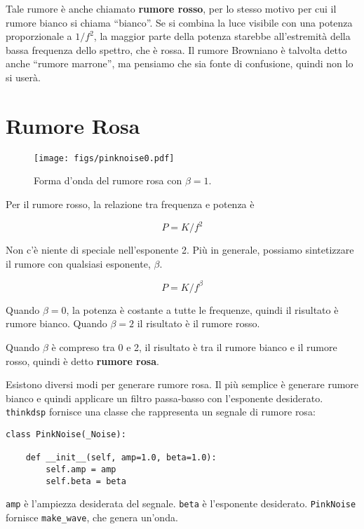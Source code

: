 \documentclass[12pt,a4paper]{book}
\begin{document}
Tale rumore è anche chiamato {\bf rumore rosso}, per lo stesso motivo per cui il rumore bianco si chiama ``bianco''. Se si combina la luce visibile con una potenza proporzionale a $1/f^2$, la maggior parte della potenza starebbe all'estremità della bassa frequenza dello spettro, che è rossa. Il rumore Browniano è talvolta detto anche ``rumore marrone'', ma pensiamo che sia fonte di confusione, quindi non lo si userà.

\section{Rumore Rosa} \label{pink} 

\begin{figure} 

\centerline{\texttt{[image: figs/pinknoise0.pdf]}} \caption{Forma d'onda del rumore rosa con $\beta=1$.} \label{fig.pinknoise0} \end{figure} 

Per il rumore rosso, la relazione tra frequenza e potenza è

%
\[ P = K / f^{2} \] 

%
Non c'è niente di speciale nell'esponente 2. Più in generale, possiamo sintetizzare il rumore con qualsiasi esponente, $\beta$.

%
\[ P = K / f^{\beta} \] 

%
Quando $\beta = 0$, la potenza è costante a tutte le frequenze, quindi il risultato è rumore bianco. Quando $\beta=2$ il risultato è il rumore rosso.

Quando $\beta$ è compreso tra 0 e 2, il risultato è tra il rumore bianco e il rumore rosso, quindi è detto {\bf rumore rosa}.

Esistono diversi modi per generare rumore rosa. Il più semplice è generare rumore bianco e quindi applicare un filtro passa-basso con l'esponente desiderato. {\tt thinkdsp} fornisce una classe che rappresenta un segnale di rumore rosa:

\begin{verbatim} 
class PinkNoise(_Noise):

    def __init__(self, amp=1.0, beta=1.0):
        self.amp = amp
        self.beta = beta
 \end{verbatim} 

{\tt amp} è l'ampiezza desiderata del segnale. {\tt beta} è l'esponente desiderato. {\tt PinkNoise} fornisce \verb"make_wave", che genera un'onda.
\end{document}

